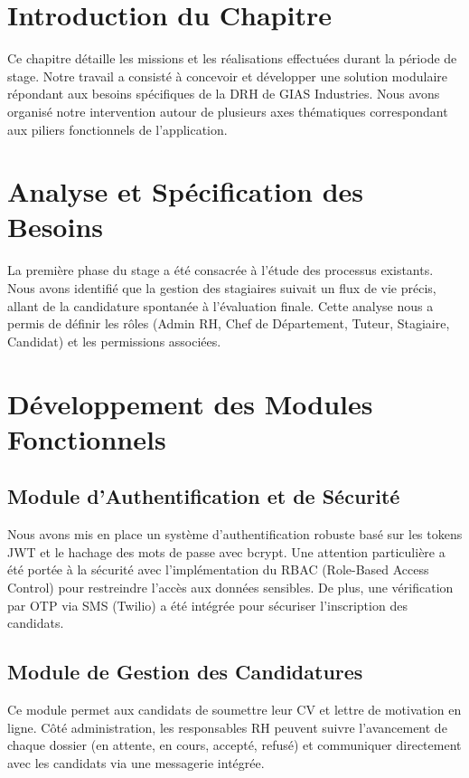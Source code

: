 \section{Introduction du Chapitre}
Ce chapitre détaille les missions et les réalisations effectuées durant la période de stage. Notre travail a consisté à concevoir et développer une solution modulaire répondant aux besoins spécifiques de la DRH de GIAS Industries. Nous avons organisé notre intervention autour de plusieurs axes thématiques correspondant aux piliers fonctionnels de l'application.

\section{Analyse et Spécification des Besoins}
La première phase du stage a été consacrée à l'étude des processus existants. Nous avons identifié que la gestion des stagiaires suivait un flux de vie précis, allant de la candidature spontanée à l'évaluation finale. Cette analyse nous a permis de définir les rôles (Admin RH, Chef de Département, Tuteur, Stagiaire, Candidat) et les permissions associées.

\section{Développement des Modules Fonctionnels}

\subsection{Module d'Authentification et de Sécurité}
Nous avons mis en place un système d'authentification robuste basé sur les tokens JWT et le hachage des mots de passe avec bcrypt. Une attention particulière a été portée à la sécurité avec l'implémentation du RBAC (Role-Based Access Control) pour restreindre l'accès aux données sensibles. De plus, une vérification par OTP via SMS (Twilio) a été intégrée pour sécuriser l'inscription des candidats.

\subsection{Module de Gestion des Candidatures}
Ce module permet aux candidats de soumettre leur CV et lettre de motivation en ligne. Côté administration, les responsables RH peuvent suivre l'avancement de chaque dossier (en attente, en cours, accepté, refusé) et communiquer directement avec les candidats via une messagerie intégrée.


